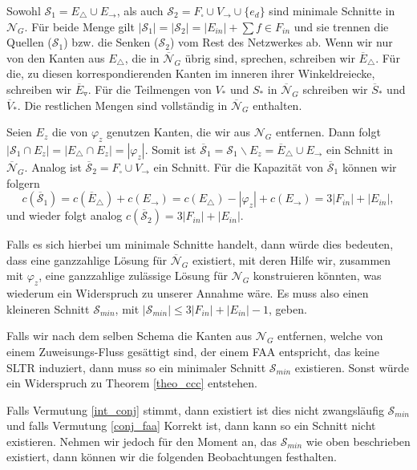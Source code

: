 Sowohl $\mathcal{S}_1 = E_\triangle \cup E_{\to}$, als auch $\mathcal{S}_2 = F_\square \cup V_{\to} \cup \{e_{d}\}$ sind minimale Schnitte in $\mathcal{N}_G$. Für beide Menge gilt $|\mathcal{S}_1| = |\mathcal{S}_2| = |E_{in}| + \sum{f \in F_{in}}$ und sie trennen die Quellen ($\mathcal{S}_1$) bzw. die Senken ($\mathcal{S}_2$) vom Rest des Netzwerkes ab. Wenn wir nur von den Kanten aus $E_\triangle$, die in $\overline{\mathcal{N}}_G$ übrig sind, sprechen, schreiben wir $\overline{E}_\triangle$. Für die, zu diesen korrespondierenden Kanten im inneren ihrer Winkeldreiecke, schreiben wir $\overline{E}_\triangledown$. Für die Teilmengen von $V_*$ und $S_*$ in $\overline{\mathcal{N}}_G$ schreiben wir $\overline{S}_*$ und $\overline{V}_*$. Die restlichen Mengen sind vollständig in $\overline{\mathcal{N}}_G$ enthalten.

Seien $E_z$ die von $\varphi_z$ genutzen Kanten, die wir aus $\mathcal{N}_G$ entfernen. Dann folgt $|\mathcal{S}_1 \cap E_z| = |E_\triangle \cap E_z| = |\varphi_z|$. Somit ist $\overline{\mathcal{S}}_1 = \mathcal{S}_1 \backslash E_z = \overline{E}_\triangle \cup E_\to$ ein Schnitt in $\overline{\mathcal{N}}_G$. Analog ist $\overline{\mathcal{S}}_2 = F_\square \cup V_{\to}$ ein Schnitt. Für die Kapazität von $\overline{\mathcal{S}}_1$ können wir folgern 
$$ c(\overline{\mathcal{S}}_1) = c(\overline{E}_\triangle) + c(E_\to) = c(E_\triangle) - |\varphi_z| + c(E_\to) = 3|F_{in}| + |E_{in}|,$$
und wieder folgt analog $c(\overline{\mathcal{S}}_2) = 3|F_{in}| + |E_{in}|$.

Falls es sich hierbei um minimale Schnitte handelt, dann würde dies bedeuten, dass eine ganzzahlige Lösung für $\overline{\mathcal{N}}_G$ existiert, mit deren Hilfe wir, zusammen mit $\varphi_z$, eine ganzzahlige zulässige Lösung für $\mathcal{N}_G$ konstruieren könnten, was wiederum ein Widerspruch zu unserer Annahme wäre. Es muss also einen kleineren Schnitt $\mathcal{S}_{min}$, mit $|\mathcal{S}_{min}| \leq 3|F_{in}| + |E_{in}| - 1$, geben. 

\begin{remark}
Falls wir nach dem selben Schema die Kanten aus $\mathcal{N}_G$ entfernen, welche von einem Zuweisungs-Fluss gesättigt sind, der einem FAA entspricht, das keine SLTR induziert, dann muss so ein minimaler Schnitt $\mathcal{S}_{min}$ existieren. Sonst würde ein Widerspruch zu Theorem \ref{theo_ccc} entstehen.
\end{remark}

Falls Vermutung \ref{int_conj} stimmt, dann existiert ist dies nicht zwangsläufig $\mathcal{S}_{min}$ und falls Vermutung \ref{conj_faa} Korrekt ist, dann kann so ein Schnitt nicht existieren. Nehmen wir jedoch für den Moment an, das $\mathcal{S}_{min}$ wie oben beschrieben existiert, dann können wir die folgenden Beobachtungen festhalten.

